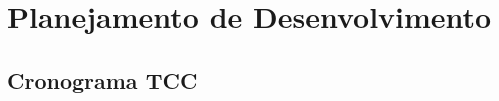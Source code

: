 \chapter[Planejamento de Desenvolvimento]{Planejamento de Desenvolvimento}
\label{cp:planejamento}

\section{Cronograma TCC}
